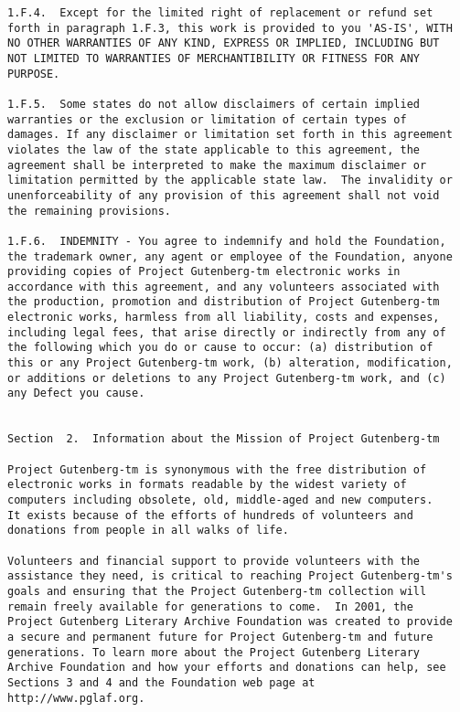 \documentclass[oneside,12pt]{book}
\begin{document}
\begin{verbatim}
1.F.4.  Except for the limited right of replacement or refund set
forth in paragraph 1.F.3, this work is provided to you 'AS-IS', WITH
NO OTHER WARRANTIES OF ANY KIND, EXPRESS OR IMPLIED, INCLUDING BUT
NOT LIMITED TO WARRANTIES OF MERCHANTIBILITY OR FITNESS FOR ANY
PURPOSE.

1.F.5.  Some states do not allow disclaimers of certain implied
warranties or the exclusion or limitation of certain types of
damages. If any disclaimer or limitation set forth in this agreement
violates the law of the state applicable to this agreement, the
agreement shall be interpreted to make the maximum disclaimer or
limitation permitted by the applicable state law.  The invalidity or
unenforceability of any provision of this agreement shall not void
the remaining provisions.

1.F.6.  INDEMNITY - You agree to indemnify and hold the Foundation,
the trademark owner, any agent or employee of the Foundation, anyone
providing copies of Project Gutenberg-tm electronic works in
accordance with this agreement, and any volunteers associated with
the production, promotion and distribution of Project Gutenberg-tm
electronic works, harmless from all liability, costs and expenses,
including legal fees, that arise directly or indirectly from any of
the following which you do or cause to occur: (a) distribution of
this or any Project Gutenberg-tm work, (b) alteration, modification,
or additions or deletions to any Project Gutenberg-tm work, and (c)
any Defect you cause.


Section  2.  Information about the Mission of Project Gutenberg-tm

Project Gutenberg-tm is synonymous with the free distribution of
electronic works in formats readable by the widest variety of
computers including obsolete, old, middle-aged and new computers.
It exists because of the efforts of hundreds of volunteers and
donations from people in all walks of life.

Volunteers and financial support to provide volunteers with the
assistance they need, is critical to reaching Project Gutenberg-tm's
goals and ensuring that the Project Gutenberg-tm collection will
remain freely available for generations to come.  In 2001, the
Project Gutenberg Literary Archive Foundation was created to provide
a secure and permanent future for Project Gutenberg-tm and future
generations. To learn more about the Project Gutenberg Literary
Archive Foundation and how your efforts and donations can help, see
Sections 3 and 4 and the Foundation web page at
http://www.pglaf.org.



\end{verbatim}
\end{document}
